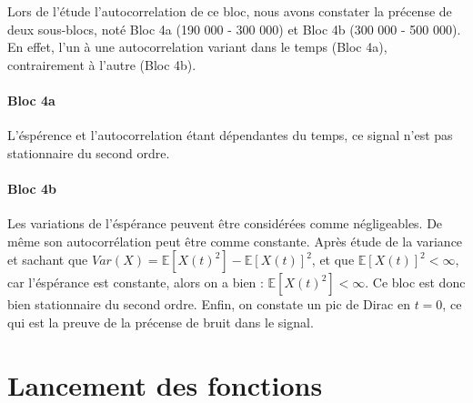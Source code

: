 \documentclass[french, a4paper, 12pt, openany]{book}
\begin{document}
	Lors de l'étude l'autocorrelation de ce bloc, nous avons constater la précense de deux sous-blocs, noté Bloc 4a (190 000 - 300 000) et Bloc 4b (300 000 - 500 000). En effet, l'un à une autocorrelation variant dans le temps (Bloc 4a), contrairement à l'autre (Bloc 4b).

	\subsubsection{Bloc 4a}
	L'éspérence et l'autocorrelation étant dépendantes du temps, ce signal n'est pas stationnaire du second ordre.

	\subsubsection{Bloc 4b}
	Les variations de l'éspérance peuvent être considérées comme négligeables. De même son autocorrélation peut être comme constante.
	Après étude de la variance et sachant que \begin{math}Var(X) = \mathbb{E}[X(t)^2] - \mathbb{E}[X(t)]^2\end{math}, et que \begin{math}\mathbb{E}[X(t)]^2<\infty\end{math}, car l'éspérance est constante, alors on a bien : \begin{math}\mathbb{E}[X(t)^2]<\infty\end{math}. Ce bloc est donc bien stationnaire du second ordre.
	Enfin, on constate un pic de Dirac en \(t = 0\), ce qui est la preuve de la précense de bruit dans le signal.

\chapter{Lancement des fonctions}
\end{document}
